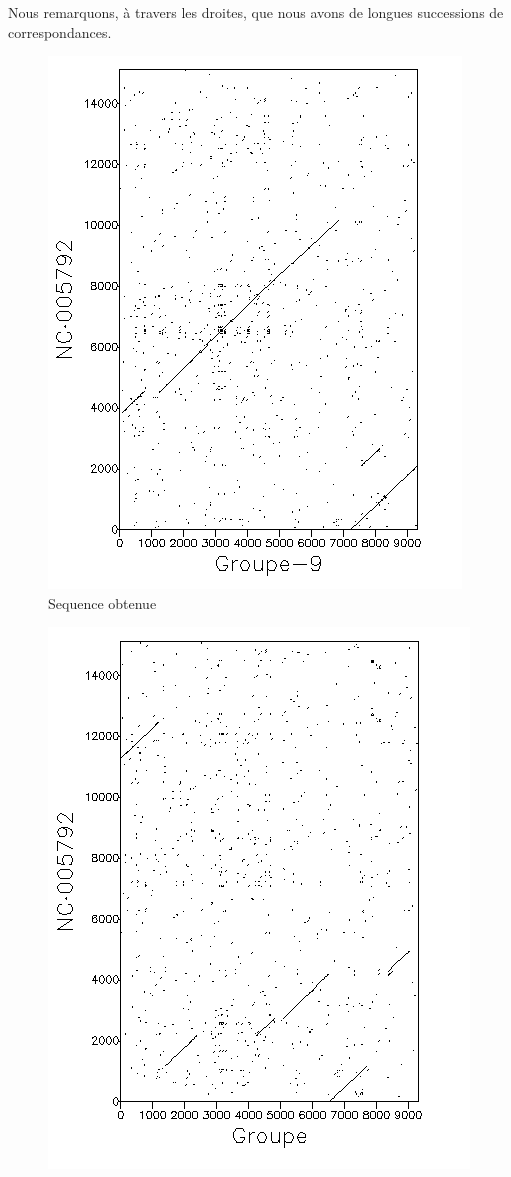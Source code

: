 Nous remarquons, à travers les droites, que nous avons de longues successions de
correspondances.

\begin{figure}[!ht]
	\begin{minipage}[r]{.46\linewidth}
		\begin{center}
		\includegraphics[scale= 0.7]{../res/cible1.png}
		Sequence obtenue
			\end{center}
\end{minipage} \hfill
\begin{minipage}[c]{.46 \linewidth}
	\begin{center}
			\includegraphics[scale= 0.7]{../res/cible1-ic.png}

\end{center}
\end{minipage}
\end{figure}
